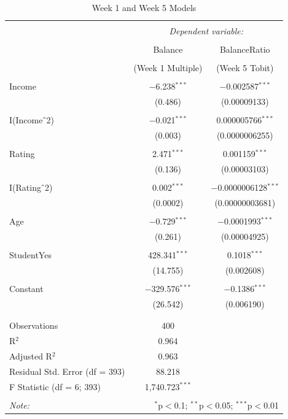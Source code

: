 \documentclass[12pt]{article}
\begin{document}
{\begin{table}[H] \centering 
  \caption{Week 1 and Week 5 Models} 
  \label{} 
\begin{tabular}{@{\extracolsep{5pt}}lcc} 
\\[-1.8ex]\hline 
\hline \\[-1.8ex] 
 & \multicolumn{2}{c}{\textit{Dependent variable:}} \\ 
\cline{2-3} 
\\[-1.8ex] & Balance & BalanceRatio \\ 
\\[-1.8ex] & (Week 1 Multiple) & (Week 5 Tobit)\\ 
\hline \\[-1.8ex] 
 Income & $-$6.238$^{***}$ & $-$0.002587$^{***}$ \\ 
  & (0.486) & (0.00009133) \\ 
  & & \\ 
 I(Income$\hat{\mkern6mu}$2) & $-$0.021$^{***}$ & 0.000005766$^{***}$ \\ 
  & (0.003) & (0.0000006255) \\ 
  & & \\ 
 Rating & 2.471$^{***}$ & 0.001159$^{***}$ \\ 
  & (0.136) & (0.00003103) \\ 
  & & \\ 
 I(Rating$\hat{\mkern6mu}$2) & 0.002$^{***}$ & $-$0.0000006128$^{***}$ \\ 
  & (0.0002) & (0.00000003681) \\ 
  & & \\ 
 Age & $-$0.729$^{***}$ & $-$0.0001993$^{***}$ \\ 
  & (0.261) & (0.00004925) \\ 
  & & \\ 
 StudentYes & 428.341$^{***}$ & 0.1018$^{***}$ \\ 
  & (14.755) & (0.002608) \\ 
  & & \\ 
 Constant & $-$329.576$^{***}$ & $-$0.1386$^{***}$ \\ 
  & (26.542) & (0.006190) \\ 
  & & \\ 
\hline \\[-1.8ex] 
Observations & 400 &  \\ 
R$^{2}$ & 0.964 &  \\ 
Adjusted R$^{2}$ & 0.963 &  \\ 
Residual Std. Error (df = 393) & 88.218 &  \\ 
F Statistic (df = 6; 393) & 1,740.723$^{***}$ & \\ 
\hline 
\hline \\[-1.8ex] 
\textit{Note:}  & \multicolumn{2}{r}{$^{*}$p$<$0.1; $^{**}$p$<$0.05; $^{***}$p$<$0.01} \\ 
\end{tabular} 
\end{table}

}
\end{document}
